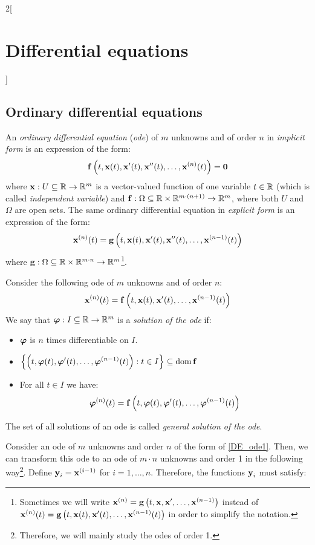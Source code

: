 \documentclass[../../../main_math.tex]{subfiles}
\begin{document}
\begin{multicols}{2}[\section{Differential equations}]
  \subsection{Ordinary differential equations}
  \begin{definition}
    An \emph{ordinary differential equation} (\emph{ode}) of $m$ unknowns and of order $n$ in \emph{implicit form} is an expression of the form: $$\boldsymbol{\mathrm{f}}\left(t,\boldsymbol{\mathrm{x}}(t),\boldsymbol{\mathrm{x}}'(t),\boldsymbol{\mathrm{x}}''(t),\ldots,\boldsymbol{\mathrm{x}}^{(n)}(t)\right)=\boldsymbol{\mathrm{0}}$$
    where $\boldsymbol{\mathrm{x}}:U\subseteq\mathbb{R}\rightarrow\mathbb{R}^m$ is a vector-valued function of one variable $t\in\mathbb{R}$ (which is called \emph{independent variable}) and $\boldsymbol{\mathrm{f}}:\Omega\subseteq\mathbb{R}\times\mathbb{R}^{m\cdot(n+1)}\rightarrow\mathbb{R}^m$, where both $U$ and $\Omega$ are open sets. The same ordinary differential equation in \emph{explicit form} is an expression of the form: $$\boldsymbol{\mathrm{x}}^{(n)}(t)=\boldsymbol{\mathrm{g}}\left(t,\boldsymbol{\mathrm{x}}(t),\boldsymbol{\mathrm{x}}'(t),\boldsymbol{\mathrm{x}}''(t),\ldots,\boldsymbol{\mathrm{x}}^{(n-1)}(t)\right)$$
    where $\boldsymbol{\mathrm{g}}:\Omega\subseteq\mathbb{R}\times\mathbb{R}^{m\cdot n}\rightarrow\mathbb{R}^m$\footnote{Sometimes we will write $\boldsymbol{\mathrm{x}}^{(n)}=\boldsymbol{\mathrm{g}}\left(t,\boldsymbol{\mathrm{x}},\boldsymbol{\mathrm{x}}',\ldots,\boldsymbol{\mathrm{x}}^{(n-1)}\right)$ instead of $\boldsymbol{\mathrm{x}}^{(n)}(t)=\boldsymbol{\mathrm{g}}\left(t,\boldsymbol{\mathrm{x}}(t),\boldsymbol{\mathrm{x}}'(t),\ldots,\boldsymbol{\mathrm{x}}^{(n-1)}(t)\right)$ in order to simplify the notation.}.
  \end{definition}
  \begin{definition}
    Consider the following ode of $m$ unknowns and of order $n$:
    \begin{equation}\label{DE_ode1}
      \boldsymbol{\mathrm{x}}^{(n)}(t)=\boldsymbol{\mathrm{f}}\left(t,\boldsymbol{\mathrm{x}}(t),\boldsymbol{\mathrm{x}}'(t),\ldots,\boldsymbol{\mathrm{x}}^{(n-1)}(t)\right)
    \end{equation}
    We say that $\boldsymbol{\mathrm{\varphi}}:I\subseteq\mathbb{R}\rightarrow\mathbb{R}^m$ is a \emph{solution of the ode} if:
    \begin{itemize}
      \item $\boldsymbol{\mathrm{\varphi}}$ is $n$ times differentiable on $I$.
      \item $\displaystyle\left\{\left(t,\boldsymbol{\mathrm{\varphi}}(t),\boldsymbol{\mathrm{\varphi}}'(t),\ldots,\boldsymbol{\mathrm{\varphi}}^{(n-1)}(t)\right):t\in I\right\}\subseteq\operatorname{dom} \boldsymbol{\mathrm{f}}$
      \item For all $t\in I$ we have:
            $$\boldsymbol{\mathrm{\varphi}}^{(n)}(t)=\boldsymbol{\mathrm{f}}\left(t,\boldsymbol{\mathrm{\varphi}}(t),\boldsymbol{\mathrm{\varphi}}'(t),\ldots,\boldsymbol{\mathrm{\varphi}}^{(n-1)}(t)\right)$$
    \end{itemize}
    The set of all solutions of an ode is called \emph{general solution of the ode}.
  \end{definition}
  \begin{proposition}
    Consider an ode of $m$ unknowns and order $n$ of the form of \cref{DE_ode1}. Then, we can transform this ode to an ode of $m\cdot n$ unknowns and order 1 in the following way\footnote{Therefore, we will mainly study the odes of order 1.}. Define $\boldsymbol{\mathrm{y}}_i=\boldsymbol{\mathrm{x}}^{(i-1)}$ for $i=1,\ldots,n$. Therefore, the functions $\boldsymbol{\mathrm{y}}_i$ must satisfy:

\end{proposition}
\end{multicols}
\end{document}
